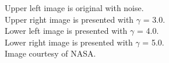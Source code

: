 \documentclass{article}
\begin{document}
\noindent
Upper left image is original with noise.\\
Upper right image is presented with $\gamma$ = 3.0.\\
Lower left image is presented with $\gamma$ = 4.0.\\
Lower right image is presented with $\gamma$ = 5.0.\\
Image courtesy of NASA.\\















\end{document}

